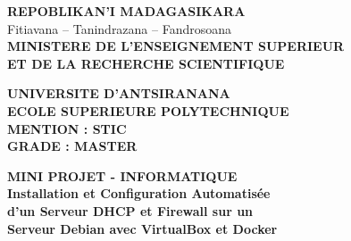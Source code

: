 \noindent
{}
\vspace{1cm}
\begin{center}
\normalsize\textbf{REPOBLIKAN’I MADAGASIKARA} \\[0.3em]
\small Fitiavana – Tanindrazana – Fandrosoana \\[1.5em]
\normalsize\textbf{MINISTERE DE L’ENSEIGNEMENT SUPERIEUR\\ET DE LA RECHERCHE SCIENTIFIQUE}
\end{center}
\begin{center}
\normalsize\textbf{UNIVERSITE D’ANTSIRANANA} \\[0.5em]
\normalsize\textbf{ECOLE SUPERIEURE POLYTECHNIQUE} \\[1.5em]
\small\textbf{MENTION : STIC} \\[0.3em]
\small\textbf{GRADE : MASTER}
\end{center}
\begin{center}
\large\textbf{MINI PROJET - INFORMATIQUE} \\[2em]
\LARGE\textbf{Installation et Configuration Automatisée}\\
\LARGE\textbf{d’un Serveur DHCP et Firewall sur un}\\
\LARGE\textbf{Serveur Debian avec VirtualBox et Docker}
\end{center}
